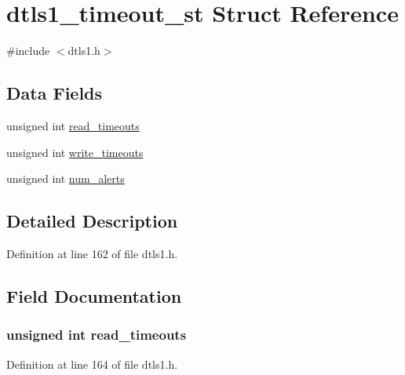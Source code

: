 \hypertarget{structdtls1__timeout__st}{}\section{dtls1\+\_\+timeout\+\_\+st Struct Reference}
\label{structdtls1__timeout__st}


{\ttfamily \#include $<$dtls1.\+h$>$}

\subsection*{Data Fields}
\begin{DoxyCompactItemize}
\item 
unsigned int \hyperlink{structdtls1__timeout__st_a8f024a7cfb8578a44260b02185bb9e55}{read\+\_\+timeouts}
\item 
unsigned int \hyperlink{structdtls1__timeout__st_a45ce047540bcfd023c6be14f409f1cd3}{write\+\_\+timeouts}
\item 
unsigned int \hyperlink{structdtls1__timeout__st_a9dc8fb0664e8d20a381e94cdf1623019}{num\+\_\+alerts}
\end{DoxyCompactItemize}


\subsection{Detailed Description}


Definition at line 162 of file dtls1.\+h.



\subsection{Field Documentation}
\subsubsection[{\texorpdfstring{read\+\_\+timeouts}{read_timeouts}}]{\setlength{\rightskip}{0pt plus 5cm}unsigned int read\+\_\+timeouts}\hypertarget{structdtls1__timeout__st_a8f024a7cfb8578a44260b02185bb9e55}{}\label{structdtls1__timeout__st_a8f024a7cfb8578a44260b02185bb9e55}


Definition at line 164 of file dtls1.\+h.


